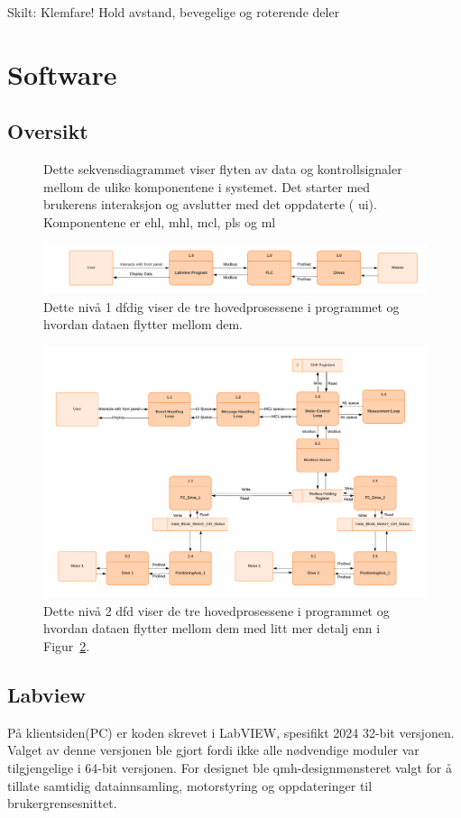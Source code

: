 \documentclass{ol-softwaremanual}
\newcommand{\figref}[1]{Figur~\ref{#1}}
\begin{document}
Skilt: Klemfare! Hold avstand, bevegelige og roterende deler

\section{Software}
\subsection{Oversikt}
\begin{figure}[H]
\centerline{}
\caption{Dette sekvensdiagrammet viser flyten av data og kontrollsignaler mellom de ulike komponentene i systemet. Det starter med brukerens interaksjon og avslutter med det oppdaterte (  \acrshort{ui}). Komponentene er \acrfull{ehl}, \acrfull{mhl}, \acrfull{mcl}, \acrfull{pls} og \acrfull{ml}}
\label{fig: Sequence}
\end{figure}
\begin{figure}[H]
\centerline{\includegraphics[width=0.75\columnwidth]{Pictures/DFD1.pdf}}
\caption{Dette nivå 1 \gls{dfdig} viser de tre hovedprosessene i programmet og hvordan dataen flytter mellom dem.}
\label{fig: lvl1}
\end{figure}
\begin{figure}[H]
\centerline{\includegraphics[width=0.75\columnwidth]{Pictures/DFD2.pdf}}
\caption{Dette nivå 2 \acrshort{dfd} viser de tre hovedprosessene i programmet og hvordan dataen flytter mellom dem med litt mer detalj enn i \figref{fig: lvl1}.}
\label{fig: lvl2}
\end{figure}
\subsection{Labview}
På klientsiden(PC) er koden skrevet i LabVIEW, spesifikt 2024 32-bit versjonen. Valget av denne versjonen ble gjort fordi ikke alle nødvendige moduler var tilgjengelige i 64-bit versjonen. For designet ble \acrfull{qmh}-designmønsteret valgt for å tillate samtidig datainnsamling, motorstyring og oppdateringer til brukergrensesnittet.
\end{document}
